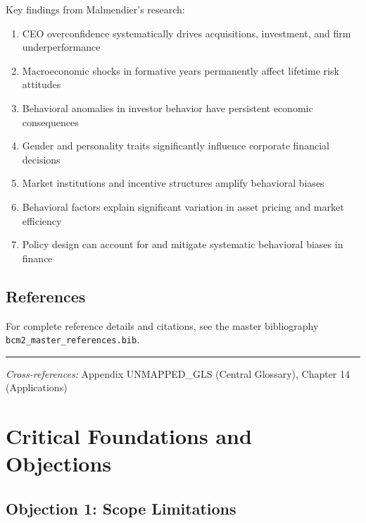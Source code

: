 Key findings from Malmendier's research:

\begin{enumerate}
  \item CEO overconfidence systematically drives acquisitions, investment, and firm underperformance
  \item Macroeconomic shocks in formative years permanently affect lifetime risk attitudes
  \item Behavioral anomalies in investor behavior have persistent economic consequences
  \item Gender and personality traits significantly influence corporate financial decisions
  \item Market institutions and incentive structures amplify behavioral biases
  \item Behavioral factors explain significant variation in asset pricing and market efficiency
  \item Policy design can account for and mitigate systematic behavioral biases in finance
\end{enumerate}

\subsection{References}

For complete reference details and citations, see the master bibliography
\texttt{bcm2\_master\_references.bib}.

\vspace{1em}
\hrule
\vspace{0.5em}

\noindent\textit{Cross-references:}
Appendix UNMAPPED_GLS (Central Glossary), Chapter 14 (Applications)



\section{Critical Foundations and Objections}
\label{sec:mal-foundations}

\subsection{Objection 1: Scope Limitations}

